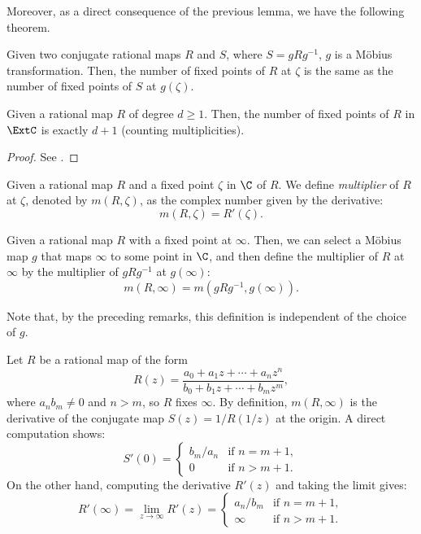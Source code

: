 Moreover, as a direct consequence of the previous lemma, we have the following
theorem.

\begin{theorem}
    Given two conjugate rational maps $R$ and $S$, where $S = g R g^{-1}$, $g$
    is a Möbius transformation. Then, the number of fixed points of $R$ at
    $\zeta$ is the same as the number of fixed points of $S$ at $g(\zeta)$.
\end{theorem}

\begin{theorem}
    Given a rational map $R$ of degree $d \geq 1$. Then, the number of fixed
    points of $R$ in $\ExtC$ is exactly $d + 1$ (counting multiplicities).
\end{theorem}
\begin{proof}
    See \cite[40]{Beardon1991}.
\end{proof}

\begin{definition}
    Given a rational map $R$ and a fixed point $\zeta$ in $\C$ of $R$. We define
    \emph{multiplier} of $R$ at $\zeta$, denoted by $m(R, \zeta)$, as the
    complex number given by the derivative:
    \[
        m(R, \zeta) = R'(\zeta).
    \]
\end{definition}

\begin{definition}
    Given a rational map $R$ with a fixed point at $\infty$. Then, we can select
    a Möbius map $g$ that maps $\infty$ to some point in $\C$, and then define
    the multiplier of $R$ at $\infty$ by the multiplier of $g R g^{-1}$ at
    $g(\infty)$:
    \[
        m(R, \infty) = m(g R g^{-1}, g(\infty)).
    \]
\end{definition}

Note that, by the preceding remarks, this definition is independent of the
choice of $g$.

\begin{example}
    Let $R$ be a rational map of the form
    \[
        R(z) = \frac{a_0 + a_1 z + \cdots + a_n z^n}{b_0 + b_1 z + \cdots + b_m z^m},
    \]
    where $a_n b_m \neq 0$ and $n > m$, so $R$ fixes $\infty$. By definition,
    $m(R, \infty)$ is the derivative of the conjugate map $S(z) = 1/R(1/z)$ at
    the origin. A direct computation shows:
    \[
        S'(0) =
        \begin{cases}
            b_m/a_n & \text{if } n = m + 1, \\
            0 & \text{if } n > m + 1.
        \end{cases}
    \]
    On the other hand, computing the derivative $R'(z)$ and taking the limit
    gives:
    \[
        R'(\infty) = \lim_{z \to \infty} R'(z) =
        \begin{cases}
            a_n/b_m & \text{if } n = m + 1, \\
            \infty & \text{if } n > m + 1.
        \end{cases}
    \]
\end{example}

